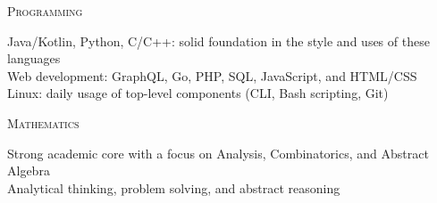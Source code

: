 \documentclass[letterpaper,10pt]{article}
\newenvironment{resumecols1}[1]
{
    \vspace{.1cm}
    \begin{minipage}[t]{.21\linewidth}
        \begin{flushright}
            \textsc{#1}
        \end{flushright}
    \end{minipage}
    \hspace{.005\linewidth}
    \begin{minipage}[t]{.77\linewidth}
}
{
    \end{minipage}
    \vspace{.1cm}
}
\begin{document}
\begin{resumecols1}{Programming}
    Java/Kotlin, Python, C/C++: solid foundation in the style and uses of these languages \\
    Web development: GraphQL, Go, PHP, SQL, JavaScript, and HTML/CSS \\
    Linux: daily usage of top-level components (CLI, Bash scripting, Git)
\end{resumecols1}

\begin{resumecols1}{Mathematics}
    Strong academic core with a focus on Analysis, Combinatorics, and Abstract Algebra \\
    Analytical thinking, problem solving, and abstract reasoning
\end{resumecols1}
\end{document}
